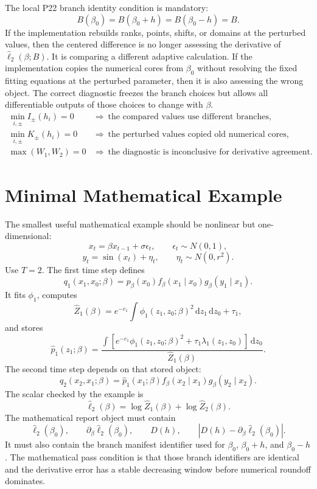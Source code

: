 \documentclass[11pt]{article}
\newcommand{\dd}{\,\mathrm d}
\newcommand{\widehatell}{\widehat\ell}
\begin{document}
The local P22 branch identity condition is mandatory:
\[
    B(\beta_0)=B(\beta_0+h)=B(\beta_0-h)=B.
    \tag{P22-FD6}
\]
If the implementation rebuilds ranks, points, shifts, or domains at the
perturbed values, then the centered difference is no longer assessing the
derivative of \(\widehatell_2(\beta;B)\).  It is comparing a different
adaptive calculation.
If the implementation copies the numerical cores from \(\beta_0\) without
resolving the fixed fitting equations at the perturbed parameter, then it is
also assessing the wrong object.  The correct diagnostic freezes the branch choices but
allows all differentiable outputs of those choices to change with \(\beta\).
\[
    \begin{array}{ll}
    \min_{i,\pm}I_\pm(h_i)=0
    &\Rightarrow\ \text{the compared values use different branches},\\[2mm]
    \min_{i,\pm}K_\pm(h_i)=0
    &\Rightarrow\ \text{the perturbed values copied old numerical cores},\\[2mm]
    \max(W_1,W_2)=0
    &\Rightarrow\ \text{the diagnostic is inconclusive for derivative agreement}.
    \end{array}
    \tag{P22-FD9}
\]

\section{Minimal Mathematical Example}

The smallest useful mathematical example should be nonlinear but one-dimensional:
\[
    x_t=\beta x_{t-1}+\sigma\epsilon_t,
    \qquad
    \epsilon_t\sim N(0,1),
    \tag{P19-102}
\]
\[
    y_t=\sin(x_t)+\eta_t,
    \qquad
    \eta_t\sim N(0,r^2).
    \tag{P19-103}
\]
Use \(T=2\).  The first time step defines
\[
    q_1(x_1,x_0;\beta)
    =
    p_\beta(x_0)
    f_\beta(x_1\mid x_0)
    g_\beta(y_1\mid x_1).
    \tag{P19-104}
\]
It fits \(\phi_1\), computes
\[
    \widehat Z_1(\beta)=e^{-c_1}\int \phi_1(z_1,z_0;\beta)^2
    \dd z_1\dd z_0+\tau_1,
    \tag{P19-105}
\]
and stores
\[
    \widehat p_1(z_1;\beta)
    =
    \frac{\int
    \left[e^{-c_1}\phi_1(z_1,z_0;\beta)^2+\tau_1\lambda_1(z_1,z_0)\right]
    \dd z_0}
    {\widehat Z_1(\beta)}.
    \tag{P19-106}
\]
The second time step depends on that stored object:
\[
    q_2(x_2,x_1;\beta)
    =
    \widehat p_1(x_1;\beta)
    f_\beta(x_2\mid x_1)
    g_\beta(y_2\mid x_2).
    \tag{P19-107}
\]
The scalar checked by the example is
\[
    \widehatell_2(\beta)
    =
    \log\widehat Z_1(\beta)
    +
    \log\widehat Z_2(\beta).
    \tag{P19-108}
\]
The mathematical report object must contain
\[
    \widehatell_2(\beta_0),
    \qquad
    \partial_\beta\widehatell_2(\beta_0),
    \qquad
    D(h),
    \qquad
    |D(h)-\partial_\beta\widehatell_2(\beta_0)|.
    \tag{P19-109}
\]
It must also contain the branch manifest identifier used for \(\beta_0\),
\(\beta_0+h\), and \(\beta_0-h\).  The mathematical pass condition is that
those branch identifiers are identical and the derivative error has a stable
decreasing window before numerical roundoff dominates.
\end{document}
